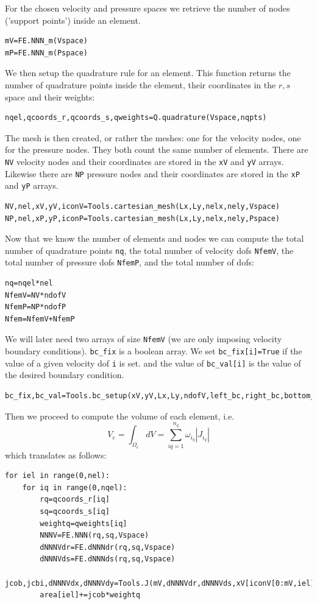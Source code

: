 For the chosen velocity and pressure spaces we retrieve the number of nodes 
('support points') inside an element.
\begin{lstlisting}
mV=FE.NNN_m(Vspace)
mP=FE.NNN_m(Pspace)
\end{lstlisting}

We then setup the quadrature rule for an element. This function 
returns the number of quadrature points inside the element, 
their coordinates in the $r,s$ space and their weights: 
\begin{lstlisting}
nqel,qcoords_r,qcoords_s,qweights=Q.quadrature(Vspace,nqpts)
\end{lstlisting}

The mesh is then created, or rather the meshes: one for the 
velocity nodes, one for the pressure nodes. They both count the 
same number of elements. There are \lstinline{NV} velocity nodes and their
coordinates are stored in the \lstinline{xV} and \lstinline{yV} arrays.
Likewise there are \lstinline{NP} pressure nodes and their
coordinates are stored in the \lstinline{xP} and \lstinline{yP} arrays. 

\begin{lstlisting}
NV,nel,xV,yV,iconV=Tools.cartesian_mesh(Lx,Ly,nelx,nely,Vspace)
NP,nel,xP,yP,iconP=Tools.cartesian_mesh(Lx,Ly,nelx,nely,Pspace)
\end{lstlisting}

Now that we know the number of elements and nodes we can compute the 
total number of quadrature points \lstinline{nq}, 
the total number of velocity dofs \lstinline{NfemV}, 
the total number of pressure dofs \lstinline{NfemP}, 
and the total number of dofs:

\begin{lstlisting}
nq=nqel*nel
NfemV=NV*ndofV
NfemP=NP*ndofP
Nfem=NfemV+NfemP
\end{lstlisting}

We will later need two arrays of size \lstinline{NfemV} (we are only imposing
velocity boundary conditions). \lstinline{bc_fix} is a boolean array.
We set \lstinline{bc_fix[i]=True} if the value of a given velocity dof \lstinline{i} is set. 
and the value of \lstinline{bc_val[i]} is the value of the desired boundary condition.

\begin{lstlisting}
bc_fix,bc_val=Tools.bc_setup(xV,yV,Lx,Ly,ndofV,left_bc,right_bc,bottom_bc,top_bc)
\end{lstlisting}

Then we proceed to compute the volume of each element, i.e. 
\[
V_e = \int_{\Omega_e} dV = \sum_{iq=1}^{n_q} \omega_{i_q} |J_{i_q}|
\]
which translates as follows: 
\begin{lstlisting}
for iel in range(0,nel):
    for iq in range(0,nqel):
        rq=qcoords_r[iq]
        sq=qcoords_s[iq]
        weightq=qweights[iq]
        NNNV=FE.NNN(rq,sq,Vspace)
        dNNNVdr=FE.dNNNdr(rq,sq,Vspace)
        dNNNVds=FE.dNNNds(rq,sq,Vspace)
        jcob,jcbi,dNNNVdx,dNNNVdy=Tools.J(mV,dNNNVdr,dNNNVds,xV[iconV[0:mV,iel]],yV[iconV[0:mV,iel]])
        area[iel]+=jcob*weightq
\end{lstlisting}



